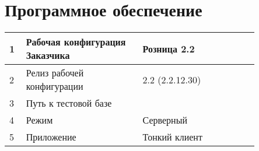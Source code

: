\section{Программное обеспечение}

\begin{tabular}{p{0.05\linewidth}p{0.4\linewidth}p{0.4\linewidth}}
	\toprule   
	1 & Рабочая конфигурация Заказчика & Розница 2.2 \\
	\hline
	2 & Релиз рабочей конфигурации & 2.2 (2.2.12.30) \\
	\hline
	3 & Путь к тестовой базе  &  \\
	\hline
	4 & Режим  & Серверный \\
	\hline
	5 & Приложение & Тонкий клиент \\
	\bottomrule %
\end{tabular}